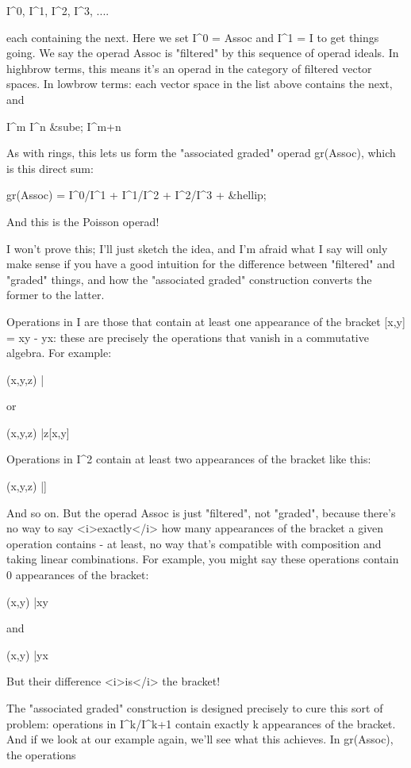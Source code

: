 I^{0}, I^{1}, I^{2}, I^{3}, ....

each containing the next.  Here we set I^{0} = Assoc and
I^{1} = I to get things going.  We say the operad Assoc is
"filtered" by this sequence of operad ideals.  In highbrow
terms, this means it's an operad in the category of filtered vector
spaces.  In lowbrow terms: each vector space in the list
above contains the next, and

I^{m} I^{n} &sube; I^{m+n}

As with rings, this lets us form the "associated graded"
operad gr(Assoc), which is this direct sum:

gr(Assoc) = I^{0}/I^{1} + I^{1}/I^{2} + I^{2}/I^{3} + &hellip;

And this is the Poisson operad!

I won't prove this; I'll just sketch the idea, and I'm afraid what I
say will only make sense if you have a good intuition for the
difference between "filtered" and "graded" things,
and how the "associated graded" construction converts the
former to the latter.

Operations in I are those that contain at least one appearance of the
bracket [x,y] = xy - yx: these are precisely the operations that
vanish in a commutative algebra.  For example:

(x,y,z) |\to  [xy,z]

or 

(x,y,z) |\to  z[x,y]

Operations in I^{2} contain at least two appearances of the
bracket like this:

(x,y,z) |\to  [x,[y,z]]

And so on.  But the operad Assoc is just "filtered", not
"graded", because there's no way to say <i>exactly</i> how
many appearances of the bracket a given operation contains - at least,
no way that's compatible with composition and taking linear
combinations.  For example, you might say these operations contain 0
appearances of the bracket:

(x,y) |\to  xy 

and

(x,y) |\to  yx

But their difference <i>is</i> the bracket!

The "associated graded" construction is designed precisely
to cure this sort of problem: operations in
I^{k}/I^{k+1} contain exactly k appearances of the
bracket.  And if we look at our example again, we'll see what this
achieves.  In gr(Assoc), the operations

